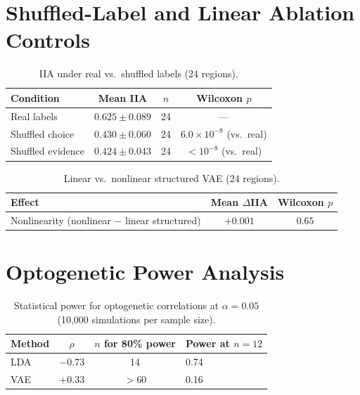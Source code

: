 \documentclass{article}
\begin{document}
\section{Shuffled-Label and Linear Ablation Controls}
\label{app:shuffled_ablation}

\begin{table}[h]
\centering
\small
\caption{IIA under real vs.\ shuffled labels (24 regions).}
\label{tab:shuffled}
\begin{tabular}{@{}lccc@{}}
\toprule
\textbf{Condition} & \textbf{Mean IIA} & \textbf{$n$} & \textbf{Wilcoxon $p$} \\
\midrule
Real labels & $0.625 \pm 0.089$ & 24 & --- \\
Shuffled choice & $0.430 \pm 0.060$ & 24 & $6.0 \times 10^{-8}$ (vs.\ real) \\
Shuffled evidence & $0.424 \pm 0.043$ & 24 & $< 10^{-8}$ (vs.\ real) \\
\bottomrule
\end{tabular}
\end{table}

\begin{table}[h]
\centering
\small
\caption{Linear vs.\ nonlinear structured VAE (24 regions).}
\label{tab:linear_ablation}
\begin{tabular}{@{}lcc@{}}
\toprule
\textbf{Effect} & \textbf{Mean $\Delta$IIA} & \textbf{Wilcoxon $p$} \\
\midrule
Nonlinearity (nonlinear $-$ linear structured) & $+0.001$ & $0.65$ \\
\bottomrule
\end{tabular}
\end{table}


\section{Optogenetic Power Analysis}
\label{app:power}

\begin{table}[h]
\centering
\small
\caption{Statistical power for optogenetic correlations at $\alpha = 0.05$ (10,000 simulations per sample size).}
\label{tab:power}
\begin{tabular}{@{}lccl@{}}
\toprule
\textbf{Method} & \textbf{$\rho$} & \textbf{$n$ for 80\% power} & \textbf{Power at $n = 12$} \\
\midrule
LDA & $-0.73$ & 14 & 0.74 \\
VAE & $+0.33$ & $> 60$ & 0.16 \\
\bottomrule
\end{tabular}
\end{table}
\end{document}
